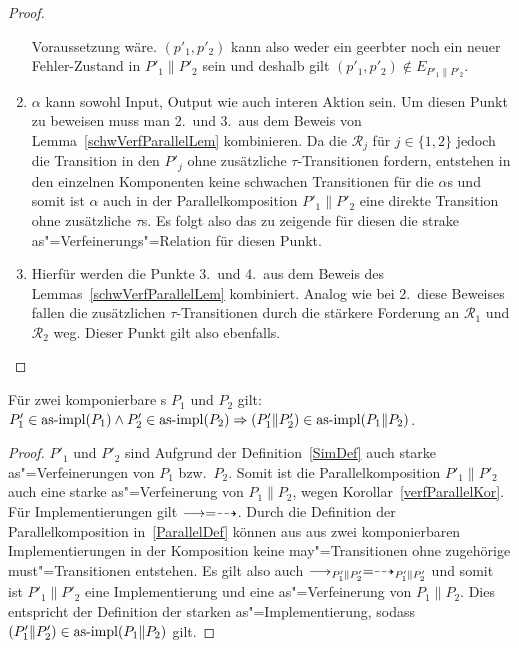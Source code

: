 \begin{proof}
\begin{enumerate}
      Voraussetzung wäre. $(p'_1,p'_2)$ kann also weder ein geerbter noch ein
      neuer Fehler-Zustand in $P'_1\|P'_2$ sein und deshalb gilt
      $(p'_1,p'_2)\notin E_{P'_1\|P'_2}$.
    \item $\alpha$ kann sowohl Input, Output wie auch interen Aktion sein. Um
      diesen Punkt zu beweisen muss man 2.\ und 3.\ aus dem Beweis von
      Lemma~\ref{schwVerfParallelLem} kombinieren. Da die $\mathcal{R}_j$ für
      $j\in\{1,2\}$ jedoch die Transition in den $P'_j$ ohne zusätzliche
      $\tau$-Transitionen fordern, entstehen in den einzelnen Komponenten keine
      schwachen Transitionen für die $\alpha$s und somit ist $\alpha$ auch in
      der Parallelkomposition $P'_1\|P'_2$ eine direkte Transition ohne
      zusätzliche $\tau$s. Es folgt also das zu zeigende für diesen die strake
      as"=Verfeinerungs"=Relation für diesen Punkt.
    \item Hierfür werden die Punkte 3.\ und 4.\ aus dem Beweis des
      Lemmas~\ref{schwVerfParallelLem} kombiniert. Analog wie bei 2.\ diese
      Beweises fallen die zusätzlichen $\tau$-Transitionen durch die stärkere
      Forderung an $\mathcal{R}_1$ und $\mathcal{R}_2$ weg. Dieser Punkt gilt
      also ebenfalls.
  \end{enumerate}
\end{proof}

\begin{Kor}
  Für zwei komponierbare \MEIO{}s $P_1$ und $P_2$ gilt:
  $P'_1\in\mathrm{as}\text{-}\mathrm{impl} (P_1) \land P'_2 \in\mathrm{as}\text{-}\mathrm{impl} (P_2) \Rightarrow (P'_1\|P'_2)
  \in\mathrm{as}\text{-}\mathrm{impl} (P_1\|P_2)$.
\end{Kor}
\begin{proof}
  $P'_1$ und $P'_2$ sind Aufgrund der Definition~\ref{SimDef} auch starke
  as"=Verfeinerungen von $P_1$ bzw.\ $P_2$. Somit ist die Parallelkomposition
  $P'_1\|P'_2$ auch eine starke as"=Verfeinerung von $P_1\|P_2$, wegen
  Korollar~\ref{verfParallelKor}. Für Implementierungen gilt $\must =\may$.
  Durch die Definition der Parallelkomposition in~\ref{ParallelDef} können aus
  aus zwei komponierbaren Implementierungen in der Komposition keine
  may"=Transitionen ohne zugehörige must"=Transitionen entstehen. Es gilt also
  auch $\must _{P'_1\|P'_2} =\may _{P'_1\|P'_2}$ und somit ist $P'_1\|P'_2$
  eine Implementierung und eine as"=Verfeinerung von $P_1\|P_2$. Dies
  entspricht der Definition der starken as"=Implementierung, sodass
  $(P'_1\|P'_2)\in\mathrm{as}\text{-}\mathrm{impl} (P_1\|P_2)$ gilt.
\end{proof}

